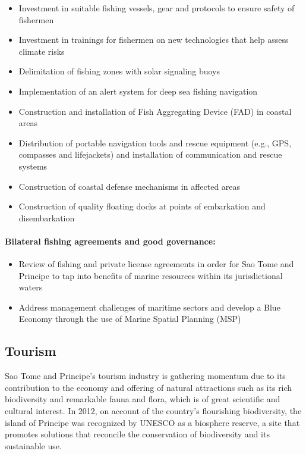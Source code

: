 \documentclass[
]{book}
\providecommand{\tightlist}{%
  \setlength{\itemsep}{0pt}\setlength{\parskip}{0pt}}
\begin{document}
\begin{itemize}
\tightlist
\item
  Investment in suitable fishing vessels, gear and protocols to ensure safety of fishermen
\item
  Investment in trainings for fishermen on new technologies that help assess climate risks
\item
  Delimitation of fishing zones with solar signaling buoys
\item
  Implementation of an alert system for deep sea fishing navigation
\item
  Construction and installation of Fish Aggregating Device (FAD) in coastal areas
\item
  Distribution of portable navigation tools and rescue equipment (e.g., GPS, compasses and lifejackets) and installation of communication and rescue systems
\item
  Construction of coastal defense mechanisms in affected areas
\item
  Construction of quality floating docks at points of embarkation and disembarkation
\end{itemize}

\hypertarget{bilateral-fishing-agreements-and-good-governance}{%
\paragraph{Bilateral fishing agreements and good governance:}\label{bilateral-fishing-agreements-and-good-governance}}

\begin{itemize}
\tightlist
\item
  Review of fishing and private license agreements in order for Sao Tome and Principe to tap into benefits of marine resources within its jurisdictional waters
\item
  Address management challenges of maritime sectors and develop a Blue Economy through the use of Marine Spatial Planning (MSP)
\end{itemize}

\hypertarget{tourism}{%
\subsection{Tourism}\label{tourism}}

Sao Tome and Principe's tourism industry is gathering momentum due to its contribution to the economy and offering of natural attractions such as its rich biodiversity and remarkable fauna and flora, which is of great scientific and cultural interest. In 2012, on account of the country's flourishing biodiversity, the island of Principe was recognized by UNESCO as a biosphere reserve, a site that promotes solutions that reconcile the conservation of biodiversity and its sustainable use.
\end{document}
